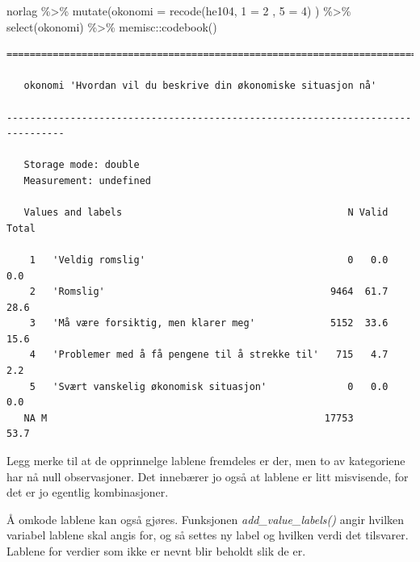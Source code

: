 \documentclass[
  letterpaper,
  DIV=11,
  numbers=noendperiod]{scrreprt}
\newenvironment{Shaded}{\begin{snugshade}}{\end{snugshade}}
\newcommand{\AttributeTok}[1]{\textcolor[rgb]{0.40,0.45,0.13}{#1}}
\newcommand{\DecValTok}[1]{\textcolor[rgb]{0.68,0.00,0.00}{#1}}
\newcommand{\FunctionTok}[1]{\textcolor[rgb]{0.28,0.35,0.67}{#1}}
\newcommand{\NormalTok}[1]{\textcolor[rgb]{0.00,0.23,0.31}{#1}}
\newcommand{\OtherTok}[1]{\textcolor[rgb]{0.00,0.23,0.31}{#1}}
\newcommand{\SpecialCharTok}[1]{\textcolor[rgb]{0.37,0.37,0.37}{#1}}
\newcommand{\StringTok}[1]{\textcolor[rgb]{0.13,0.47,0.30}{#1}}
\begin{document}
\begin{Shaded}
\begin{Highlighting}[]
\NormalTok{norlag }\SpecialCharTok{\%\textgreater{}\%} 
  \FunctionTok{mutate}\NormalTok{(}\AttributeTok{okonomi =} \FunctionTok{recode}\NormalTok{(he104, }
                          \StringTok{\textasciigrave{}}\AttributeTok{1}\StringTok{\textasciigrave{}} \OtherTok{=} \DecValTok{2}\NormalTok{ ,}
                          \StringTok{\textasciigrave{}}\AttributeTok{5}\StringTok{\textasciigrave{}} \OtherTok{=} \DecValTok{4}\NormalTok{) ) }\SpecialCharTok{\%\textgreater{}\%} 
  \FunctionTok{select}\NormalTok{(okonomi) }\SpecialCharTok{\%\textgreater{}\%} 
\NormalTok{  memisc}\SpecialCharTok{::}\FunctionTok{codebook}\NormalTok{()}
\end{Highlighting}
\end{Shaded}

\begin{verbatim}
================================================================================

   okonomi 'Hvordan vil du beskrive din økonomiske situasjon nå'

--------------------------------------------------------------------------------

   Storage mode: double
   Measurement: undefined

   Values and labels                                       N Valid Total
                                                                        
    1   'Veldig romslig'                                   0   0.0   0.0
    2   'Romslig'                                       9464  61.7  28.6
    3   'Må være forsiktig, men klarer meg'             5152  33.6  15.6
    4   'Problemer med å få pengene til å strekke til'   715   4.7   2.2
    5   'Svært vanskelig økonomisk situasjon'              0   0.0   0.0
   NA M                                                17753        53.7
\end{verbatim}

Legg merke til at de opprinnelge lablene fremdeles er der, men to av
kategoriene har nå null observasjoner. Det innebærer jo også at lablene
er litt misvisende, for det er jo egentlig kombinasjoner.

Å omkode lablene kan også gjøres. Funksjonen \emph{add\_value\_labels()}
angir hvilken variabel lablene skal angis for, og så settes ny label og
hvilken verdi det tilsvarer. Lablene for verdier som ikke er nevnt blir
beholdt slik de er.
\end{document}
